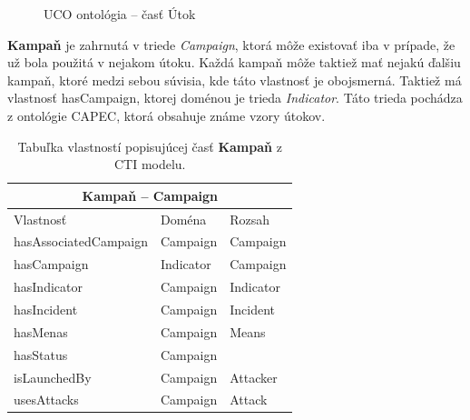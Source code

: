 \documentclass[12pt, a4paper, oneside]{book}
\begin{document}
\begin{figure}
\label{fig:semantic_web}
\caption{UCO ontológia -- časť Útok}
\end{figure}

\textbf{Kampaň} je zahrnutá v triede \textit{Campaign}, ktorá môže existovať iba v prípade, že už bola použitá v nejakom útoku. Každá kampaň môže taktiež mať nejakú ďalšiu kampaň, ktoré medzi sebou súvisia, kde táto vlastnosť je obojsmerná. Taktiež má vlastnosť hasCampaign, ktorej doménou je trieda \textit{Indicator}. Táto trieda pochádza z ontológie CAPEC, ktorá obsahuje známe vzory útokov.
\begin{table}[hbt!]
\centering
\begin{tabular}{ |p{5cm}||p{3cm}|p{3cm}|  }
 \hline
 \multicolumn{3}{|c|}{Kampaň -- Campaign} \\
 \hline
 Vlastnosť & Doména & Rozsah\\
 \hline
 hasAssociatedCampaign & Campaign & Campaign\\
 hasCampaign & Indicator & Campaign\\
 hasIndicator & Campaign & Indicator\\
 hasIncident & Campaign & Incident\\
 hasMenas & Campaign & Means\\
 hasStatus & Campaign & \\
 isLaunchedBy & Campaign & Attacker\\
 usesAttacks & Campaign & Attack\\
 \hline
\end{tabular}
\caption{Tabuľka vlastností popisujúcej časť \textbf{Kampaň} z CTI modelu.}
\label{tab:template}
\end{table}
\end{document}
